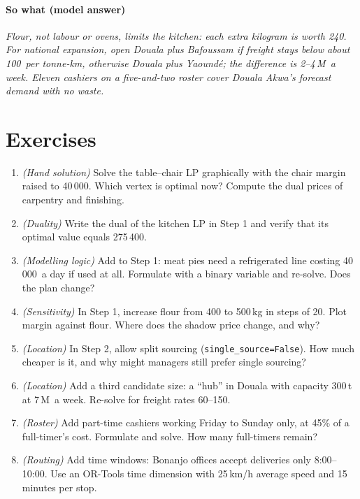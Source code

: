 \paragraph{So what (model answer)} \emph{Flour, not labour or ovens, limits the kitchen: each extra kilogram is
worth 240\xaf. For national expansion, open Douala plus Bafoussam if freight stays below about 100\xaf\ per tonne-km,
otherwise Douala plus Yaoundé; the difference is 2--4\,M\xaf\ a week. Eleven cashiers on a five-and-two roster cover
Douala Akwa's forecast demand with no waste.}

\section{Exercises}
\begin{enumerate}[label=\textbf{5.\arabic*},leftmargin=2.4em]
\item \emph{(Hand solution)} Solve the table--chair LP graphically with the chair margin raised to 40\,000\xaf. Which
vertex is optimal now? Compute the dual prices of carpentry and finishing.
\item \emph{(Duality)} Write the dual of the kitchen LP in Step 1 and verify that its optimal value equals 275\,400\xaf.
\item \emph{(Modelling logic)} Add to Step 1: meat pies need a refrigerated line costing 40\,000\xaf\ a day if used at all.
Formulate with a binary variable and re-solve. Does the plan change?
\item \emph{(Sensitivity)} In Step 1, increase flour from 400 to 500\,kg in steps of 20. Plot margin against flour. Where
does the shadow price change, and why?
\item \emph{(Location)} In Step 2, allow split sourcing (\texttt{single\_source=False}). How much cheaper is it, and why
might managers still prefer single sourcing?
\item \emph{(Location)} Add a third candidate size: a ``hub'' in Douala with capacity 300\,t at 7\,M\xaf\ a week. Re-solve
for freight rates 60--150\xaf.
\item \emph{(Roster)} Add part-time cashiers working Friday to Sunday only, at 45\% of a full-timer's cost. Formulate and
solve. How many full-timers remain?
\item \emph{(Routing)} Add time windows: Bonanjo offices accept deliveries only 8:00--10:00. Use an OR-Tools time dimension
with 25\,km/h average speed and 15 minutes per stop.
\end{enumerate}

